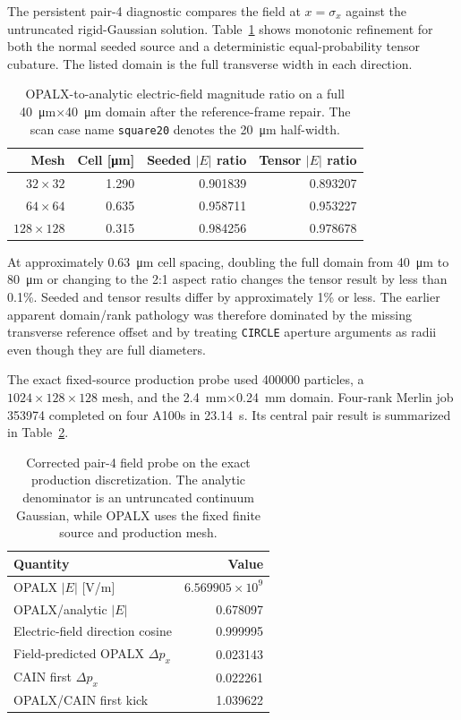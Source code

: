 \documentclass[11pt]{article}
\begin{document}
The persistent pair-4 diagnostic compares the field at $x=\sigma_x$ against
the untruncated rigid-Gaussian solution.  Table~\ref{tab:track12-field-convergence}
shows monotonic refinement for both the normal seeded source and a deterministic
equal-probability tensor cubature.  The listed domain is the full transverse
width in each direction.

\begin{table}[htbp]
  \centering
  \begin{tabular}{rrrr}
    \hline
    Mesh & Cell [\si{\micro m}] & Seeded $|E|$ ratio & Tensor $|E|$ ratio \\
    \hline
    $32\times32$   & 1.290 & 0.901839 & 0.893207 \\
    $64\times64$   & 0.635 & 0.958711 & 0.953227 \\
    $128\times128$ & 0.315 & 0.984256 & 0.978678 \\
    \hline
  \end{tabular}
  \caption{OPALX-to-analytic electric-field magnitude ratio on a full
  \SI{40}{\micro m}$\times$\SI{40}{\micro m} domain after the reference-frame
  repair.  The scan case name \texttt{square20} denotes the
  \SI{20}{\micro m} half-width.}
  \label{tab:track12-field-convergence}
\end{table}

At approximately \SI{0.63}{\micro m} cell spacing, doubling the full domain
from \SI{40}{\micro m} to \SI{80}{\micro m} or changing to the 2:1 aspect
ratio changes the tensor result by less than 0.1\%.  Seeded and tensor results
differ by approximately 1\% or less.
The earlier apparent domain/rank pathology was therefore dominated by the
missing transverse reference offset and by treating \texttt{CIRCLE} aperture
arguments as radii even though they are full diameters.

The exact fixed-source production probe used 400000 particles, a
$1024\times128\times128$ mesh, and the
\SI{2.4}{mm}$\times$\SI{0.24}{mm} domain.  Four-rank Merlin job 353974
completed on four A100s in \SI{23.14}{s}.  Its central pair result is
summarized in Table~\ref{tab:track12-corrected-pair4-probe}.

\begin{table}[htbp]
  \centering
  \begin{tabular}{lr}
    \hline
    Quantity & Value \\
    \hline
    OPALX $|E|$ [\si{V/m}] & $6.569905\times10^9$ \\
    OPALX/analytic $|E|$ & 0.678097 \\
    Electric-field direction cosine & 0.999995 \\
    Field-predicted OPALX $\Delta p_x$ & 0.023143 \\
    CAIN first $\Delta p_x$ & 0.022261 \\
    OPALX/CAIN first kick & 1.039622 \\
    \hline
  \end{tabular}
  \caption{Corrected pair-4 field probe on the exact production
  discretization.  The analytic denominator is an untruncated continuum
  Gaussian, while OPALX uses the fixed finite source and production mesh.}
  \label{tab:track12-corrected-pair4-probe}
\end{table}
\end{document}
